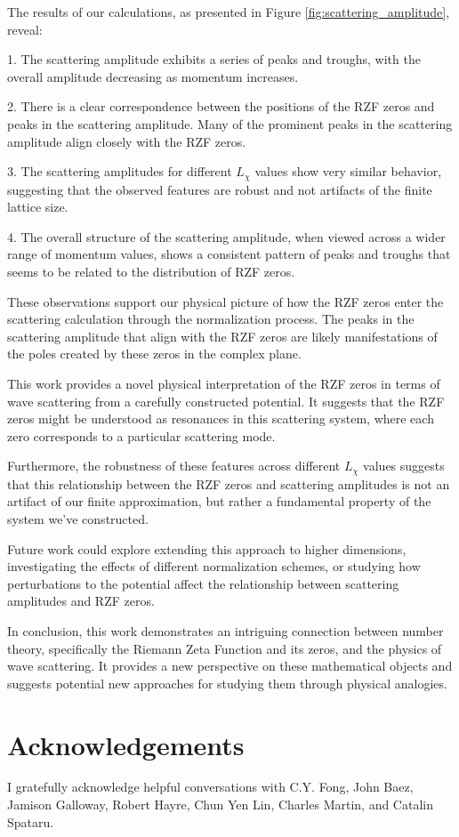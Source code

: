 \documentclass[11pt, oneside]{article}
\begin{document}
The results of our calculations, as presented in Figure \ref{fig:scattering_amplitude}, reveal:

1. The scattering amplitude exhibits a series of peaks and troughs, with the overall amplitude decreasing as momentum increases.

2. There is a clear correspondence between the positions of the RZF zeros and peaks in the scattering amplitude. Many of the prominent peaks in the scattering amplitude align closely with the RZF zeros.

3. The scattering amplitudes for different $L_\chi$ values show very similar behavior, suggesting that the observed features are robust and not artifacts of the finite lattice size.

4. The overall structure of the scattering amplitude, when viewed across a wider range of momentum values, shows a consistent pattern of peaks and troughs that seems to be related to the distribution of RZF zeros.

These observations support our physical picture of how the RZF zeros enter the scattering calculation through the normalization process. The peaks in the scattering amplitude that align with the RZF zeros are likely manifestations of the poles created by these zeros in the complex plane.

This work provides a novel physical interpretation of the RZF zeros in terms of wave scattering from a carefully constructed potential. It suggests that the RZF zeros might be understood as resonances in this scattering system, where each zero corresponds to a particular scattering mode.

Furthermore, the robustness of these features across different $L_\chi$ values suggests that this relationship between the RZF zeros and scattering amplitudes is not an artifact of our finite approximation, but rather a fundamental property of the system we've constructed.

Future work could explore extending this approach to higher dimensions, investigating the effects of different normalization schemes, or studying how perturbations to the potential affect the relationship between scattering amplitudes and RZF zeros.

In conclusion, this work demonstrates an intriguing connection between number theory, specifically the Riemann Zeta Function and its zeros, and the physics of wave scattering. It provides a new perspective on these mathematical objects and suggests potential new approaches for studying them through physical analogies.

\section{Acknowledgements}
I gratefully acknowledge helpful conversations with C.Y. Fong, John Baez, Jamison Galloway, Robert Hayre, Chun Yen Lin, Charles Martin, and Catalin Spataru.

\printbibliography
\end{document}
